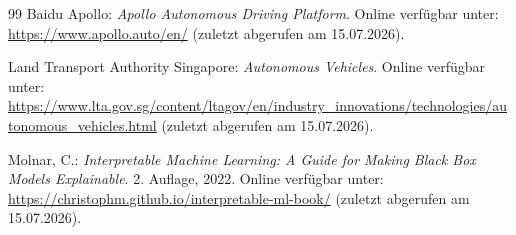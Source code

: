 \documentclass[12pt,a4paper]{article}
\begin{document}
\begin{thebibliography}{99}
Baidu Apollo:
\textit{Apollo Autonomous Driving Platform}.
Online verfügbar unter:
\url{https://www.apollo.auto/en/}
(zuletzt abgerufen am 15.07.2026).

Land Transport Authority Singapore:
\textit{Autonomous Vehicles}.
Online verfügbar unter:
\url{https://www.lta.gov.sg/content/ltagov/en/industry_innovations/technologies/autonomous_vehicles.html}
(zuletzt abgerufen am 15.07.2026).

Molnar, C.:
\textit{Interpretable Machine Learning: A Guide for Making Black Box
Models Explainable}.
2. Auflage, 2022.
Online verfügbar unter:
\url{https://christophm.github.io/interpretable-ml-book/}
(zuletzt abgerufen am 15.07.2026).

\end{thebibliography}
\end{document}
